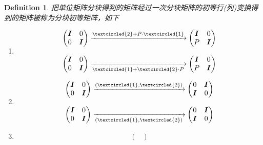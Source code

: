 \documentclass{article}
\newtheorem{definition}[theorem]{Definition}
\newcommand{\mbf}[1]{\bm{#1}}
\begin{document}
\begin{definition}
\rm 把单位矩阵分块得到的矩阵经过一次分块矩阵的初等行(列)变换得到的矩阵被称为分块初等矩阵，如下
\begin{enumerate}
	\item 
	$$
	\begin{array}{ll}
	\begin{pmatrix} 
	\mbf{I} & 0 \\
	0 & \mbf{I} 
	\end{pmatrix}\xrightarrow{\tiny\textcircled{2} + P \cdot \tiny\textcircled{1}}
	\begin{pmatrix} 
	\mbf{I} & 0 \\
	P & \mbf{I}
	\end{pmatrix} \\ \\
	\begin{pmatrix} 
	\mbf{I} & 0 \\
	0 & \mbf{I} 
	\end{pmatrix}\xrightarrow[\tiny\textcircled{1} +  \tiny\textcircled{2} \cdot P]{}
	\begin{pmatrix} 
	\mbf{I} & 0 \\
	P & \mbf{I}
	\end{pmatrix}
	\end{array} 
	$$
	\item 
	$$
	\begin{array}{ll}
	\begin{pmatrix} 
	\mbf{I} & 0 \\
	0 & \mbf{I} 
	\end{pmatrix}\xrightarrow{(\tiny\textcircled{1} , \tiny\textcircled{2})}
	\begin{pmatrix} 
	0 & \mbf{I}  \\
	\mbf{I} & 0 
	\end{pmatrix} \\ \\
	\begin{pmatrix} 
	\mbf{I} & 0 \\
	0 & \mbf{I} 
	\end{pmatrix}\xrightarrow[(\tiny\textcircled{1} , \tiny\textcircled{2})]{}
	\begin{pmatrix} 
	0 & \mbf{I}  \\
	\mbf{I} & 0 
	\end{pmatrix}
	\end{array}
	$$
	\item
	$$
	\begin{array}{ll}
	\begin{pmatrix} 

\end{pmatrix}
\end{array}$$
\end{enumerate}
\end{definition}
\end{document}
